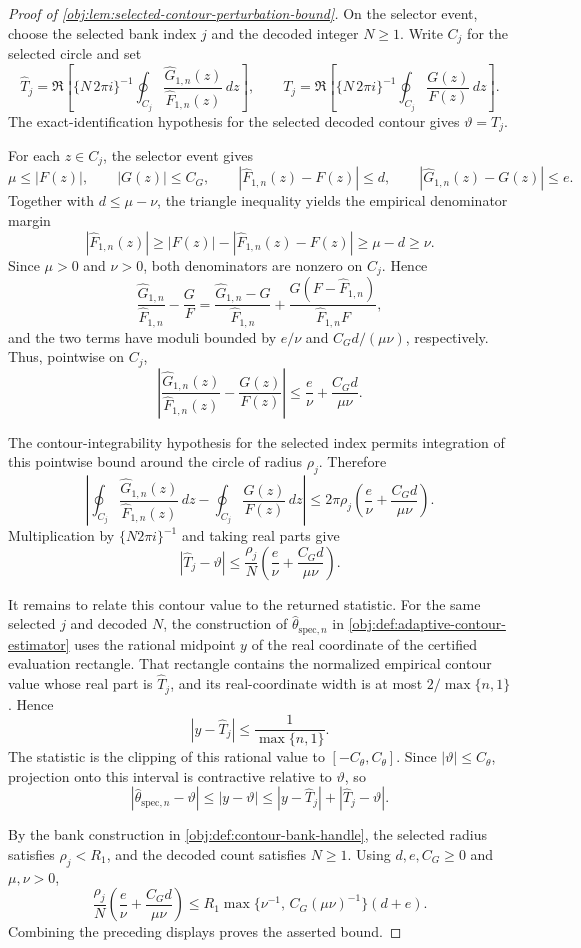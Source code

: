 \documentclass[11pt]{article}
\begin{document}
\begin{proof}[Proof of \cref{obj:lem:selected-contour-perturbation-bound}]
On the selector event, choose the selected bank index \(j\) and the decoded integer
\(N\ge1\).  Write \(C_j\) for the selected circle and set
\[
\widehat T_j
=
\Re\left[
\{N\,2\pi i\}^{-1}
\oint_{C_j}
\frac{\widehat G_{1,n}(z)}{\widehat F_{1,n}(z)}\,dz
\right],
\qquad
T_j
=
\Re\left[
\{N\,2\pi i\}^{-1}
\oint_{C_j}
\frac{G(z)}{F(z)}\,dz
\right].
\]
The exact-identification hypothesis for the selected decoded contour gives
\(\vartheta=T_j\).

For each \(z\in C_j\), the selector event gives
\[
\mu\le |F(z)|,
\qquad
|G(z)|\le C_G,
\qquad
|\widehat F_{1,n}(z)-F(z)|\le d,
\qquad
|\widehat G_{1,n}(z)-G(z)|\le e .
\]
Together with \(d\le\mu-\nu\), the triangle inequality yields the empirical
denominator margin
\[
|\widehat F_{1,n}(z)|
\ge |F(z)|-|\widehat F_{1,n}(z)-F(z)|
\ge \mu-d
\ge \nu .
\]
Since \(\mu>0\) and \(\nu>0\), both denominators are nonzero on \(C_j\).  Hence
\[
\frac{\widehat G_{1,n}}{\widehat F_{1,n}}-
\frac{G}{F}
=
\frac{\widehat G_{1,n}-G}{\widehat F_{1,n}}
+
\frac{G(F-\widehat F_{1,n})}{\widehat F_{1,n}F},
\]
and the two terms have moduli bounded by \(e/\nu\) and
\(C_Gd/(\mu\nu)\), respectively.  Thus, pointwise on \(C_j\),
\[
\left|
\frac{\widehat G_{1,n}(z)}{\widehat F_{1,n}(z)}-
\frac{G(z)}{F(z)}
\right|
\le
\frac{e}{\nu}+\frac{C_Gd}{\mu\nu}.
\]

The contour-integrability hypothesis for the selected index permits integration
of this pointwise bound around the circle of radius \(\rho_j\).  Therefore
\[
\left|
\oint_{C_j}
\frac{\widehat G_{1,n}(z)}{\widehat F_{1,n}(z)}\,dz
-
\oint_{C_j}
\frac{G(z)}{F(z)}\,dz
\right|
\le
2\pi\rho_j
\left(\frac{e}{\nu}+\frac{C_Gd}{\mu\nu}\right).
\]
Multiplication by \(\{N2\pi i\}^{-1}\) and taking real parts give
\[
|\widehat T_j-\vartheta|
\le
\frac{\rho_j}{N}
\left(\frac{e}{\nu}+\frac{C_Gd}{\mu\nu}\right).
\]

It remains to relate this contour value to the returned statistic.  For the same
selected \(j\) and decoded \(N\), the construction of
\(\widehat\theta_{\mathrm{spec},n}\) in
\cref{obj:def:adaptive-contour-estimator} uses the rational midpoint \(y\) of the
real coordinate of the certified evaluation rectangle.  That rectangle contains
the normalized empirical contour value whose real part is \(\widehat T_j\), and
its real-coordinate width is at most \(2/\max\{n,1\}\).  Hence
\[
|y-\widehat T_j|\le \frac{1}{\max\{n,1\}}.
\]
The statistic is the clipping of this rational value to
\([-C_{\theta},C_{\theta}]\).  Since \(|\vartheta|\le C_{\theta}\), projection
onto this interval is contractive relative to \(\vartheta\), so
\[
|\widehat\theta_{\mathrm{spec},n}-\vartheta|
\le |y-\vartheta|
\le |y-\widehat T_j|+|\widehat T_j-\vartheta|.
\]

By the bank construction in \cref{obj:def:contour-bank-handle}, the selected
radius satisfies \(\rho_j<R_1\), and the decoded count satisfies \(N\ge1\).  Using
\(d,e,C_G\ge0\) and \(\mu,\nu>0\),
\[
\frac{\rho_j}{N}
\left(\frac{e}{\nu}+\frac{C_Gd}{\mu\nu}\right)
\le
R_1\max\{\nu^{-1},\,C_G(\mu\nu)^{-1}\}(d+e).
\]
Combining the preceding displays proves the asserted bound.
\end{proof}
\end{document}
